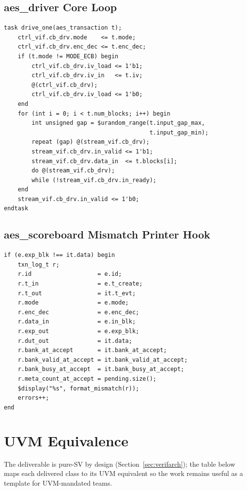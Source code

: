 \documentclass[conference,10pt,a4paper]{IEEEtran}
\begin{document}
\subsection{aes\_driver Core Loop}
\begin{lstlisting}
task drive_one(aes_transaction t);
    ctrl_vif.cb_drv.mode    <= t.mode;
    ctrl_vif.cb_drv.enc_dec <= t.enc_dec;
    if (t.mode != MODE_ECB) begin
        ctrl_vif.cb_drv.iv_load <= 1'b1;
        ctrl_vif.cb_drv.iv_in   <= t.iv;
        @(ctrl_vif.cb_drv);
        ctrl_vif.cb_drv.iv_load <= 1'b0;
    end
    for (int i = 0; i < t.num_blocks; i++) begin
        int unsigned gap = $urandom_range(t.input_gap_max,
                                          t.input_gap_min);
        repeat (gap) @(stream_vif.cb_drv);
        stream_vif.cb_drv.in_valid <= 1'b1;
        stream_vif.cb_drv.data_in  <= t.blocks[i];
        do @(stream_vif.cb_drv);
        while (!stream_vif.cb_drv.in_ready);
    end
    stream_vif.cb_drv.in_valid <= 1'b0;
endtask
\end{lstlisting}

\subsection{aes\_scoreboard Mismatch Printer Hook}
\begin{lstlisting}
if (e.exp_blk !== it.data) begin
    txn_log_t r;
    r.id                   = e.id;
    r.t_in                 = e.t_create;
    r.t_out                = it.t_evt;
    r.mode                 = e.mode;
    r.enc_dec              = e.enc_dec;
    r.data_in              = e.in_blk;
    r.exp_out              = e.exp_blk;
    r.dut_out              = it.data;
    r.bank_at_accept       = it.bank_at_accept;
    r.bank_valid_at_accept = it.bank_valid_at_accept;
    r.bank_busy_at_accept  = it.bank_busy_at_accept;
    r.meta_count_at_accept = pending.size();
    $display("%s", format_mismatch(r));
    errors++;
end
\end{lstlisting}

\section{UVM Equivalence}
\label{app:uvm}

The deliverable is pure-SV by design (Section~\ref{sec:verifarch}); the
table below maps each delivered class to its UVM equivalent so the
work remains useful as a template for UVM-mandated teams.
\end{document}
